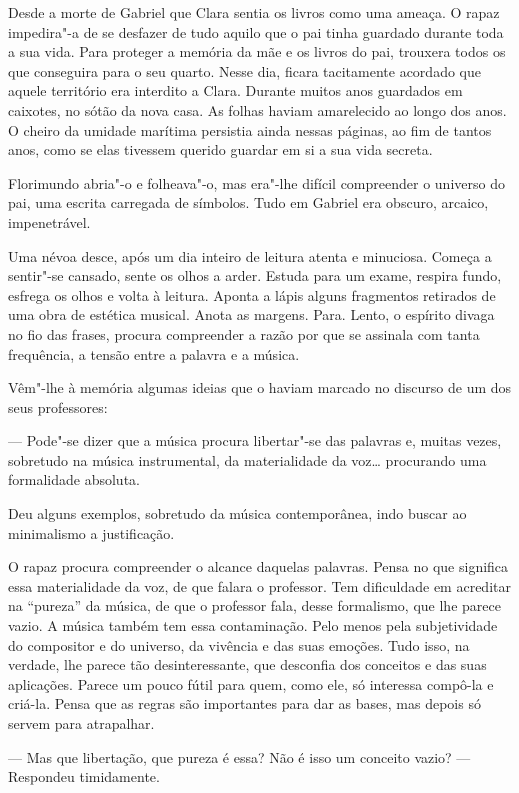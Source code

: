 Desde a morte de Gabriel que Clara sentia os livros como uma ameaça. O
rapaz impedira"-a de se desfazer de tudo aquilo que o pai tinha guardado
durante toda a sua vida. Para proteger a memória da mãe e os livros do
pai, trouxera todos os que conseguira para o seu quarto. Nesse dia,
ficara tacitamente acordado que aquele território era interdito a Clara.
Durante muitos anos guardados em caixotes, no sótão da nova casa. As
folhas haviam amarelecido ao longo dos anos. O cheiro da umidade
marítima persistia ainda nessas páginas, ao fim de tantos anos, como se
elas tivessem querido guardar em si a sua vida secreta.

Florimundo abria"-o e folheava"-o, mas era"-lhe difícil compreender o
universo do pai, uma escrita carregada de símbolos. Tudo em Gabriel era
obscuro, arcaico, impenetrável.

Uma névoa desce, após um dia inteiro de leitura atenta e minuciosa.
Começa a sentir"-se cansado, sente os olhos a arder. Estuda para um
exame, respira fundo, esfrega os olhos e volta à leitura. Aponta a lápis
alguns fragmentos retirados de uma obra de estética musical. Anota as
margens. Para. Lento, o espírito divaga no fio das frases, procura
compreender a razão por que se assinala com tanta frequência, a tensão
entre a palavra e a música.

Vêm"-lhe à memória algumas ideias que o haviam marcado no discurso de um
dos seus professores:

--- Pode"-se dizer que a música procura libertar"-se das palavras e, muitas
vezes, sobretudo na música instrumental, da materialidade da voz\ldots{}
procurando uma formalidade absoluta.

Deu alguns exemplos, sobretudo da música contemporânea, indo buscar ao
minimalismo a justificação.

O rapaz procura compreender o alcance daquelas palavras. Pensa no que
significa essa materialidade da voz, de que falara o professor. Tem
dificuldade em acreditar na ``pureza'' da música, de que o professor
fala, desse formalismo, que lhe parece vazio. A música também tem essa
contaminação. Pelo menos pela subjetividade do compositor e do
universo, da vivência e das suas emoções. Tudo isso, na verdade, lhe
parece tão desinteressante, que desconfia dos conceitos e das suas
aplicações. Parece um pouco fútil para quem, como ele, só interessa
compô-la e criá-la. Pensa que as regras são importantes para dar as
bases, mas depois só servem para atrapalhar.

--- Mas que libertação, que pureza é essa? Não é isso um conceito vazio?
--- Respondeu timidamente.

